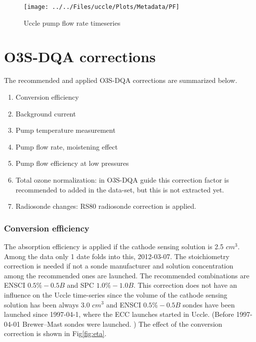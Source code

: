     \begin{figure}
        \centering
\texttt{[image: ../../Files/uccle/Plots/Metadata/PF]}
    \caption{Uccle pump flow rate timeseries}
            \label{fig:PF}
    \end{figure}

\section{O3S-DQA corrections}
\label{sec:dqa}


The recommended and applied O3S-DQA corrections are summarized below.
    \begin{enumerate}
        \item Conversion efficiency
        \item Background current
        \item Pump temperature measurement
        \item Pump flow rate, moistening effect
        \item Pump flow efficiency at low pressures
        \item Total ozone normalization: in O3S-DQA guide this correction factor is recommended to added in the data-set,
        but this is not extracted yet.
        \item Radiosonde changes: RS80 radiosonde correction is applied.
\end{enumerate}

 \subsubsection{Conversion efficiency}
    The absorption efficiency is applied if the cathode sensing solution is 2.5 $cm^3$. Among the data only 1 date folds into this, 2012-03-07.
    The stoichiometry correction is needed if not a sonde manufacturer and solution concentration among the recommended ones are launched. The recommended combinations are
    ENSCI $0.5\%-0.5B$ and SPC $1.0\%-1.0B$. This correction does not have an influence on the Uccle time-series since the volume of the cathode sensing solution has been always
    3.0 $cm^3$ and ENSCI $0.5\%-0.5B$ sondes have been launched since 1997-04-1, where the ECC launches started in Uccle. (Before 1997-04-01 Brewer–Mast sondes were launched. )
    The effect of the conversion correction is shown in Fig\ref{fig:eta}.

